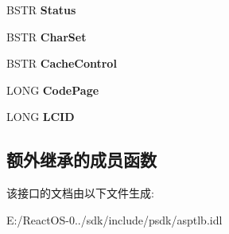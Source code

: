 \begin{DoxyCompactItemize}
\mbox{\label{interface_i_response_ac8c9adfb05f453b0a95218f413cb6189}} 
B\+S\+TR {\bfseries Status}
\item 
\mbox{\label{interface_i_response_a6f199f732f42acb6b746c265c73aa173}} 
B\+S\+TR {\bfseries Char\+Set}
\item 
\mbox{\label{interface_i_response_a75274da4eb0bfe6afca39d6ae4f8043e}} 
B\+S\+TR {\bfseries Cache\+Control}
\item 
\mbox{\label{interface_i_response_ace72d65e5f5b71298b80e861b5c831d5}} 
L\+O\+NG {\bfseries Code\+Page}
\item 
\mbox{\label{interface_i_response_a468ff2356e1413b035c994eba5d5e64b}} 
L\+O\+NG {\bfseries L\+C\+ID}
\end{DoxyCompactItemize}
\subsection*{额外继承的成员函数}


该接口的文档由以下文件生成\+:\begin{DoxyCompactItemize}
\item 
E\+:/\+React\+O\+S-\/0../sdk/include/psdk/asptlb.\+idl\end{DoxyCompactItemize}
